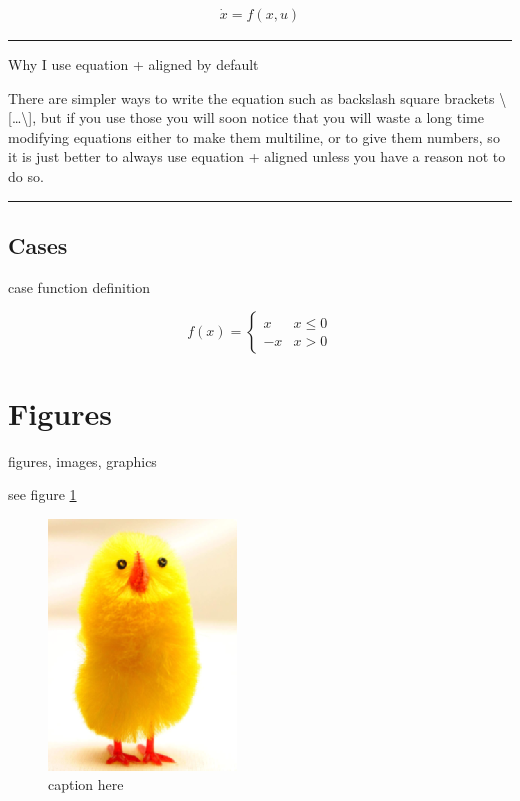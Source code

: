 \documentclass[12pt]{article}
\newcommand{\inOut}[1]{#1}                                %
\begin{document}
    \begin{example} \label{expFor1}
        \inOut{
            \begin{equation}\begin{aligned}\label{eqFor1}
                \dot{x} = f(x,u)
            \end{aligned}\end{equation}
        }
    \end{example}\hrule

    \begin{remark}\label{remFor1} Why I use equation + aligned by default

        There are simpler ways to write the equation such as backslash square brackets \textbackslash{}[\ldots\textbackslash{}],
        but if you use those you will soon notice that you will waste a long time modifying equations
        either to make them multiline, or to give them numbers, so it is just better to always use
        equation + aligned unless you have a reason not to do so.
    \end{remark}\hrule

\subsection{Cases}\label{cases}

    case function definition

    \begin{equation}
    f(x) =
    \begin{cases}
        x & x \le 0 \\
        -x & x>0
    \end{cases}
    \end{equation}

\section{Figures}\label{secTab}

    figures, images, graphics

    see figure \ref{fig-label}

    \begin{figure}[htb]
        \centering
        \includegraphics[width=5cm]{image.png}
        \caption{caption here}
        \label{fig-label}
    \end{figure}
\end{document}
